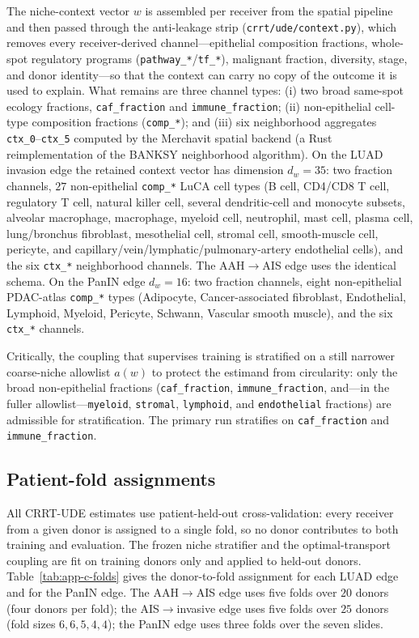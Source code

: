 The niche-context vector $w$ is assembled per receiver from the spatial pipeline and then passed
through the anti-leakage strip (\texttt{crrt/ude/context.py}), which removes every receiver-derived
channel---epithelial composition fractions, whole-spot regulatory programs
(\texttt{pathway\_*}/\texttt{tf\_*}), malignant fraction, diversity, stage, and donor identity---so
that the context can carry no copy of the outcome it is used to explain. What remains are three
channel types: (i) two broad same-spot ecology fractions, \texttt{caf\_fraction} and
\texttt{immune\_fraction}; (ii) non-epithelial cell-type composition fractions (\texttt{comp\_*});
and (iii) six neighborhood aggregates \texttt{ctx\_0}--\texttt{ctx\_5} computed by the Merchavit
spatial backend (a Rust reimplementation of the BANKSY neighborhood algorithm). On the LUAD invasion
edge the retained context vector has dimension $d_w = 35$: two fraction channels, $27$ non-epithelial
\texttt{comp\_*} LuCA cell types (B cell, CD4/CD8 T cell, regulatory T cell, natural killer cell,
several dendritic-cell and monocyte subsets, alveolar macrophage, macrophage, myeloid cell,
neutrophil, mast cell, plasma cell, lung/bronchus fibroblast, mesothelial cell, stromal cell,
smooth-muscle cell, pericyte, and capillary/vein/lymphatic/pulmonary-artery endothelial cells), and
the six \texttt{ctx\_*} neighborhood channels. The AAH$\rightarrow$AIS edge uses the identical schema.
On the PanIN edge $d_w = 16$: two fraction channels, eight non-epithelial PDAC-atlas
\texttt{comp\_*} types (Adipocyte, Cancer-associated fibroblast, Endothelial, Lymphoid, Myeloid,
Pericyte, Schwann, Vascular smooth muscle), and the six \texttt{ctx\_*} channels.

Critically, the coupling that supervises training is stratified on a still narrower coarse-niche
allowlist $a(w)$ to protect the estimand from circularity: only the broad non-epithelial fractions
(\texttt{caf\_fraction}, \texttt{immune\_fraction}, and---in the fuller allowlist---\texttt{myeloid},
\texttt{stromal}, \texttt{lymphoid}, and \texttt{endothelial} fractions) are admissible for
stratification. The primary run stratifies on \texttt{caf\_fraction} and \texttt{immune\_fraction}.

\subsection{Patient-fold assignments}\label{sec:app-c-folds}

All CRRT-UDE estimates use patient-held-out cross-validation: every receiver from a given donor is
assigned to a single fold, so no donor contributes to both training and evaluation. The frozen niche
stratifier and the optimal-transport coupling are fit on training donors only and applied to
held-out donors. Table~\ref{tab:app-c-folds} gives the donor-to-fold assignment for each LUAD edge
and for the PanIN edge. The AAH$\rightarrow$AIS edge uses five folds over $20$ donors (four donors
per fold); the AIS$\rightarrow$invasive edge uses five folds over $25$ donors (fold sizes
$6,6,5,4,4$); the PanIN edge uses three folds over the seven slides.

